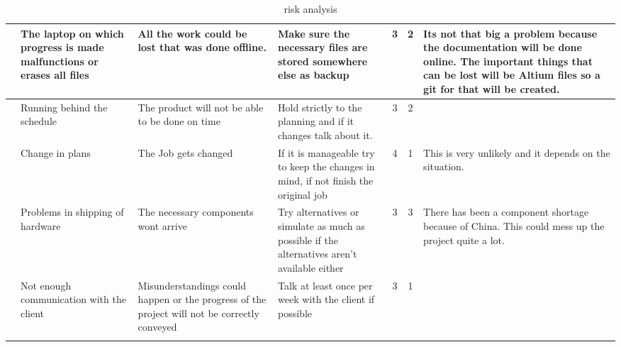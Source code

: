 \begin{longtable}{| c | p{3cm} | p{3cm} | p{4cm} | c | c | p{3cm} |}
    \\ \hline
    \theriskTableCounter{} &
    \stepcounter{riskTableCounter}
    The laptop on which progress is made malfunctions or erases all files&
    All the work could be lost that was done offline. &
    Make sure the necessary files are stored somewhere else as backup& 
    3&
    2&
    Its not that big a problem because the documentation will be done online. The important things that can be lost will be Altium files so a git for that will be created.
    \\ \hline
    \theriskTableCounter{} &
    \stepcounter{riskTableCounter}
    Running behind the schedule&
    The product will not be able to be done on time&
    Hold strictly to the planning and if it changes talk about it.&
    3&
    2&
    
    \\ \hline
    \theriskTableCounter{} &
    \stepcounter{riskTableCounter}
    Change in plans&
    The Job gets changed&
    If it is manageable try to keep the changes in mind, if not finish the original job&
    4&
    1&
    This is very unlikely and it depends on the situation. 
    \\ \hline
    \theriskTableCounter{} &
    \stepcounter{riskTableCounter}
    Problems in shipping of hardware&
    The necessary components wont arrive&
    Try alternatives or simulate as much as possible if the alternatives aren't available either&
    3&
    3&
    There has been a component shortage because of China. This could mess up the project quite a lot.
    \\ \hline
    \theriskTableCounter{} &
    \stepcounter{riskTableCounter}
    Not enough communication with the client&
    Misunderstandings could happen or the progress of the project will not be correctly conveyed&
    Talk at least once per week with the client if possible&
    3&
    1&
    \\ \hline
    \caption{risk analysis}
    \label{tab:risico_analyse}
\end{longtable}


\newpage
